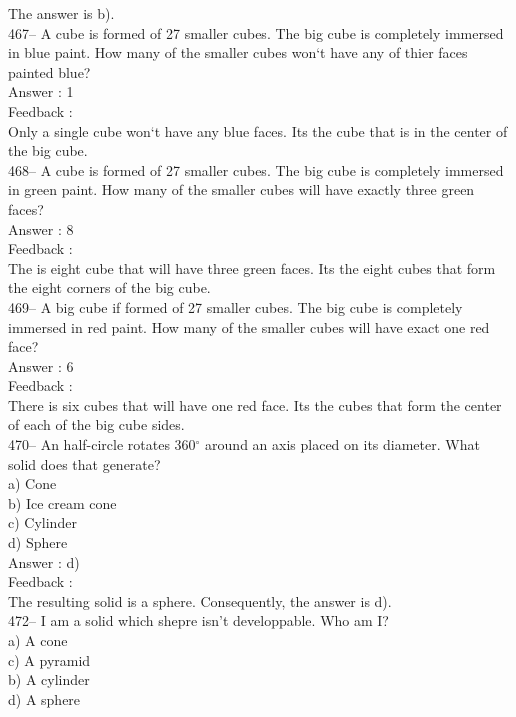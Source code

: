 \documentclass[letterpaper, 12pt]{article}
\begin{document}
The answer is b).\\

467-- A cube is formed of 27 smaller cubes. The big cube is completely immersed
in blue paint. How many of the smaller cubes won`t have any of thier faces painted blue?\\

Answer : 1\\

Feedback : \\
Only a single cube won`t have any blue faces. Its the cube that is in the center of the big cube.\\

468-- A cube is formed of 27 smaller cubes. The big cube is completely immersed
in green paint.  How many of the smaller cubes will have exactly three green faces?\\

Answer : 8\\

Feedback : \\
The is eight cube that will have three green faces. Its the eight cubes that form the eight corners of the big cube. \\

469-- A big cube if formed of 27 smaller cubes. The big cube is completely immersed in red paint. How many of the smaller cubes will have exact one red face?\\

Answer : 6\\

Feedback : \\
There is six cubes that will have one red face. Its the cubes that form the center of each of the big cube sides.  \\


470-- An half-circle rotates 360$^{\circ}$ around an axis placed on its diameter. What solid does that generate?\\
a) Cone\\
b) Ice cream cone\\
c) Cylinder\\
d) Sphere\\

Answer : d)\\

Feedback : \\
The resulting solid is a sphere.  Consequently, the answer is d).\\


472-- I am a solid which shepre isn't developpable. Who am I?\\
a) A cone\\
c) A pyramid\\
b) A cylinder\\
d) A sphere\\
\end{document}
